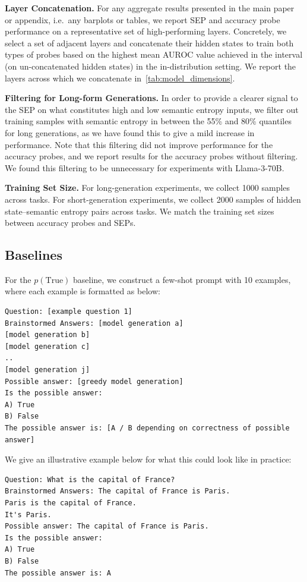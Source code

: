 \documentclass{article}
\begin{document}
\textbf{Layer Concatenation.}
For any aggregate results presented in the main paper or appendix, i.e.~any barplots or tables, we report SEP and accuracy probe performance on a representative set of high-performing layers.
Concretely, we select a set of adjacent layers and concatenate their hidden states to train both types of probes based on the highest mean AUROC value achieved in the interval (on un-concatenated hidden states) in the in-distribution setting.
We report the layers across which we concatenate in~\cref{tab:model_dimensions}.


\textbf{Filtering for Long-form Generations.}
In order to provide a clearer signal to the SEP on what constitutes high and low semantic entropy inputs, we filter out training samples with semantic entropy in between the 55\% and 80\% quantiles for long generations, as we have found this to give a mild increase in performance.
Note that this filtering did not improve performance for the accuracy probes, and we report results for the accuracy probes without filtering. %
We found this filtering to be unnecessary for experiments with Llama-3-70B.


\textbf{Training Set Size.}
For long-generation experiments, we collect 1000 samples across tasks.
For short-generation experiments, we collect 2000 samples of hidden state--semantic entropy pairs across tasks.
We match the training set sizes between accuracy probes and SEPs.







\subsection{Baselines}
For the $p(\text{True})$ baseline, we construct a few-shot prompt with 10 examples, where each example is formatted as below:

\begin{verbatim}
Question: [example question 1]
Brainstormed Answers: [model generation a]
[model generation b]
[model generation c]
..
[model generation j]
Possible answer: [greedy model generation]
Is the possible answer:
A) True
B) False
The possible answer is: [A / B depending on correctness of possible answer]
\end{verbatim}


We give an illustrative example below for what this could look like in practice:

\begin{verbatim}
Question: What is the capital of France?
Brainstormed Answers: The capital of France is Paris. 
Paris is the capital of France. 
It's Paris.
Possible answer: The capital of France is Paris.
Is the possible answer:
A) True
B) False
The possible answer is: A
\end{verbatim}
\end{document}

